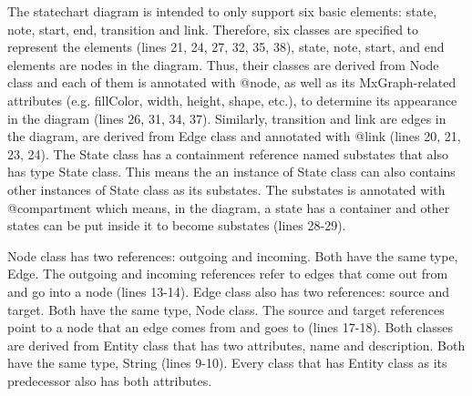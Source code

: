 \documentclass[conference]{IEEEtran}
\begin{document}
The statechart diagram is intended to only support six basic elements: state, note, start, end, transition and link. Therefore, six classes are specified to represent the elements (lines 21, 24, 27, 32, 35, 38), state, note, start, and end elements are nodes in the diagram. Thus, their classes are derived from Node class and each of them is annotated with {\selectfont @node}, as well as its MxGraph-related attributes (e.g. fillColor, width, height, shape, etc.), to determine its appearance in the diagram (lines 26, 31, 34, 37). Similarly, transition and link are edges in the diagram, are derived from Edge class and annotated with {\selectfont @link} (lines 20, 21, 23, 24). The State class has a containment reference named substates that also has type State class. This means the an instance of State class can also contains other instances of State class as its substates. The substates is annotated with {\selectfont @compartment} which means, in the diagram, a state has a container and other states can be put inside it to become substates (lines 28-29).

Node class has two references: outgoing and incoming. Both have the same type, Edge. The outgoing and incoming references refer to edges that come out from and go into a node (lines 13-14). Edge class also has two references: source and target. Both have the same type, Node class. The source and target references point to a node that an edge comes from and goes to (lines 17-18). Both classes are derived from Entity class that has two attributes, name and description. Both have the same type, String (lines 9-10). Every class that has Entity class as its predecessor also has both attributes.        
\end{document}
